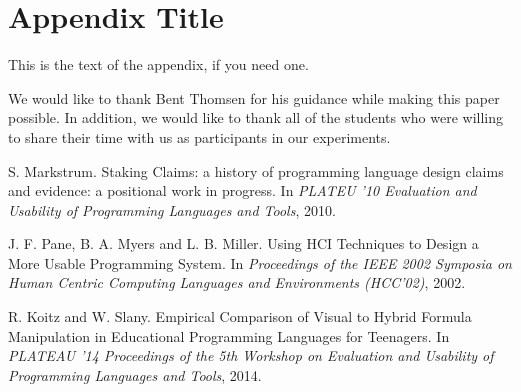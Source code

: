 \documentclass[preprint,10pt]{sigplanconf}
\begin{document}
\appendix
\section{Appendix Title}

This is the text of the appendix, if you need one.

\acks
We would like to thank Bent Thomsen for his guidance while making this paper possible. 
In addition, we would like to thank all of the students who were willing to share their time with us as participants in our experiments.





\begin{thebibliography}{}
\softraggedright

S. Markstrum. \newblock Staking Claims: a history of programming language design claims and evidence: a positional work in progress. \newblock In \emph{PLATEU '10 Evaluation and Usability of Programming Languages and Tools}, 2010.

J. F. Pane, B. A. Myers and L. B. Miller. \newblock Using HCI Techniques to Design a More Usable Programming System. \newblock In \emph{Proceedings of the IEEE 2002 Symposia on Human Centric Computing Languages and Environments (HCC’02)}, 2002.

R. Koitz and W. Slany. \newblock Empirical Comparison of Visual to Hybrid Formula Manipulation in Educational Programming Languages for Teenagers. \newblock In \emph{PLATEAU '14 Proceedings of the 5th Workshop on Evaluation and Usability of Programming Languages and Tools}, 2014.


\end{thebibliography}
\end{document}
